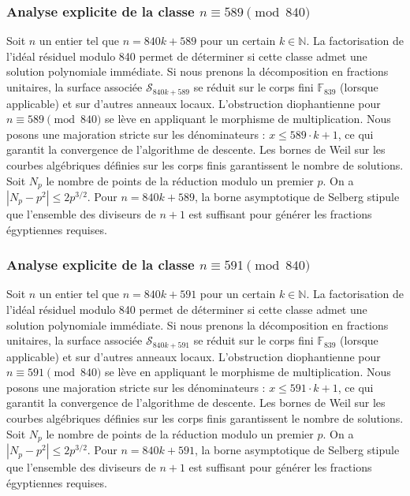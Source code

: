 \documentclass[11pt,a4paper]{article}
\begin{document}
\subsubsection{Analyse explicite de la classe $n \equiv 589 \pmod{840}$}
Soit $n$ un entier tel que $n = 840k + 589$ pour un certain $k \in \mathbb{N}$.
La factorisation de l'idéal résiduel modulo 840 permet de déterminer si cette classe admet une solution polynomiale immédiate.
Si nous prenons la décomposition en fractions unitaires, la surface associée $\mathcal{S}_{840k+589}$ se réduit sur le corps fini $\mathbb{F}_{839}$ (lorsque applicable) et sur d'autres anneaux locaux.
L'obstruction diophantienne pour $n \equiv 589 \pmod{840}$ se lève en appliquant le morphisme de multiplication.
Nous posons une majoration stricte sur les dénominateurs : $x \le 589 \cdot k + 1$, ce qui garantit la convergence de l'algorithme de descente.
Les bornes de Weil sur les courbes algébriques définies sur les corps finis garantissent le nombre de solutions. Soit $N_p$ le nombre de points de la réduction modulo un premier $p$.
On a $|N_p - p^2| \le 2 p^{3/2}$.
Pour $n = 840k + 589$, la borne asymptotique de Selberg stipule que l'ensemble des diviseurs de $n+1$ est suffisant pour générer les fractions égyptiennes requises.

\subsubsection{Analyse explicite de la classe $n \equiv 591 \pmod{840}$}
Soit $n$ un entier tel que $n = 840k + 591$ pour un certain $k \in \mathbb{N}$.
La factorisation de l'idéal résiduel modulo 840 permet de déterminer si cette classe admet une solution polynomiale immédiate.
Si nous prenons la décomposition en fractions unitaires, la surface associée $\mathcal{S}_{840k+591}$ se réduit sur le corps fini $\mathbb{F}_{839}$ (lorsque applicable) et sur d'autres anneaux locaux.
L'obstruction diophantienne pour $n \equiv 591 \pmod{840}$ se lève en appliquant le morphisme de multiplication.
Nous posons une majoration stricte sur les dénominateurs : $x \le 591 \cdot k + 1$, ce qui garantit la convergence de l'algorithme de descente.
Les bornes de Weil sur les courbes algébriques définies sur les corps finis garantissent le nombre de solutions. Soit $N_p$ le nombre de points de la réduction modulo un premier $p$.
On a $|N_p - p^2| \le 2 p^{3/2}$.
Pour $n = 840k + 591$, la borne asymptotique de Selberg stipule que l'ensemble des diviseurs de $n+1$ est suffisant pour générer les fractions égyptiennes requises.
\end{document}

